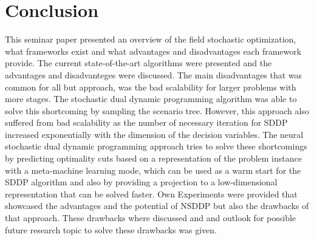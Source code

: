 \section{Conclusion}
This seminar paper presented an overview of the field stochastic optimization, what frameworks exist and what advantages and disadvantages each framework provide.
The current state-of-the-art algorithms were presented and the advantages and disadvanteges were discussed.
The main disadvantages that was common for all but approach, was the bad scalability for larger problems with more stages.
The stochastic dual dynamic programming algorithm was able to solve this shortcoming by sampling the scenario tree.
However, this approach also suffered from bad scalability as the number of necessary iteration for SDDP increased exponentially with the dimension of the decision variables.
The neural stochastic dual dynamic programming approach tries to solve these shortcomings by predicting optimality cuts based on a representation of the problem instance with a meta-machine learning mode, which can be used as a warm start for the SDDP algorithm and also by providing a projection to a low-dimensional representation that can be solved faster.
Own Experiments were provided that showcased the advantages and the potential of NSDDP but also the drawbacks of that approach.
These drawbacks where discussed and and outlook for possible future research topic to solve these drawbacks was given.
